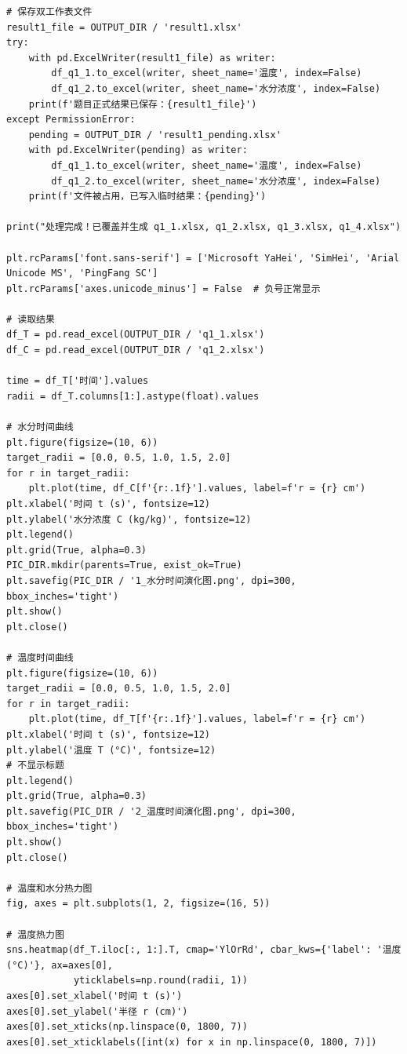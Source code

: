 \documentclass[withoutpreface,bwprint]{cumcm_thesis}
\begin{document}
\begin{appendices}
\begin{lstlisting}
# 保存双工作表文件
result1_file = OUTPUT_DIR / 'result1.xlsx'
try:
    with pd.ExcelWriter(result1_file) as writer:
        df_q1_1.to_excel(writer, sheet_name='温度', index=False)
        df_q1_2.to_excel(writer, sheet_name='水分浓度', index=False)
    print(f'题目正式结果已保存：{result1_file}')
except PermissionError:
    pending = OUTPUT_DIR / 'result1_pending.xlsx'
    with pd.ExcelWriter(pending) as writer:
        df_q1_1.to_excel(writer, sheet_name='温度', index=False)
        df_q1_2.to_excel(writer, sheet_name='水分浓度', index=False)
    print(f'文件被占用，已写入临时结果：{pending}')

print("处理完成！已覆盖并生成 q1_1.xlsx, q1_2.xlsx, q1_3.xlsx, q1_4.xlsx")

plt.rcParams['font.sans-serif'] = ['Microsoft YaHei', 'SimHei', 'Arial Unicode MS', 'PingFang SC']
plt.rcParams['axes.unicode_minus'] = False  # 负号正常显示

# 读取结果
df_T = pd.read_excel(OUTPUT_DIR / 'q1_1.xlsx')
df_C = pd.read_excel(OUTPUT_DIR / 'q1_2.xlsx')

time = df_T['时间'].values
radii = df_T.columns[1:].astype(float).values

# 水分时间曲线
plt.figure(figsize=(10, 6))
target_radii = [0.0, 0.5, 1.0, 1.5, 2.0]
for r in target_radii:
    plt.plot(time, df_C[f'{r:.1f}'].values, label=f'r = {r} cm')
plt.xlabel('时间 t (s)', fontsize=12)
plt.ylabel('水分浓度 C (kg/kg)', fontsize=12)
plt.legend()
plt.grid(True, alpha=0.3)
PIC_DIR.mkdir(parents=True, exist_ok=True)
plt.savefig(PIC_DIR / '1_水分时间演化图.png', dpi=300, bbox_inches='tight')
plt.show()
plt.close()

# 温度时间曲线
plt.figure(figsize=(10, 6))
target_radii = [0.0, 0.5, 1.0, 1.5, 2.0]
for r in target_radii:
    plt.plot(time, df_T[f'{r:.1f}'].values, label=f'r = {r} cm')
plt.xlabel('时间 t (s)', fontsize=12)
plt.ylabel('温度 T (°C)', fontsize=12)
# 不显示标题
plt.legend()
plt.grid(True, alpha=0.3)
plt.savefig(PIC_DIR / '2_温度时间演化图.png', dpi=300, bbox_inches='tight')
plt.show()
plt.close()

# 温度和水分热力图
fig, axes = plt.subplots(1, 2, figsize=(16, 5))

# 温度热力图
sns.heatmap(df_T.iloc[:, 1:].T, cmap='YlOrRd', cbar_kws={'label': '温度 (°C)'}, ax=axes[0],
            yticklabels=np.round(radii, 1))
axes[0].set_xlabel('时间 t (s)')
axes[0].set_ylabel('半径 r (cm)')
axes[0].set_xticks(np.linspace(0, 1800, 7))
axes[0].set_xticklabels([int(x) for x in np.linspace(0, 1800, 7)])


\end{lstlisting}
\end{appendices}
\end{document}
